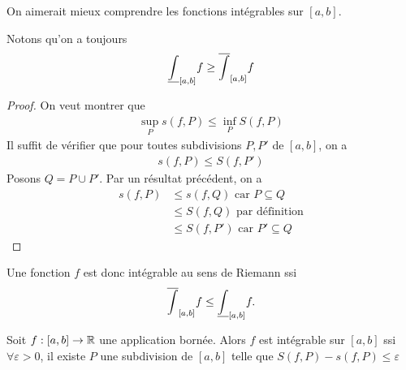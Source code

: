 On aimerait mieux comprendre les fonctions intégrables sur $[a,b]$.
\begin{proposition}
  Notons qu'on a toujours 
\begin{align*}
    \underline{\int}_{[a,b]}f  \ge \overline{\int}_{[a,b]}f
\end{align*}  
\end{proposition}
\begin{proof}
    On veut montrer que 
    \begin{align*}
        \sup_Ps(f,P) \le \inf_P S(f,P)
    \end{align*}
    Il suffit de vérifier que pour toutes subdivisions $P,P'$ de $[a,b]$, on a 
    \begin{align*}
        s(f,P) \le S(f,P')
    \end{align*}
Posons $Q = P\cup P'$. Par un résultat précédent, on a \begin{align*}
    s(f,P)&\le s(f,Q) \text{ car $P\subseteq Q$}\\
    &\le S(f,Q)\text{ par définition}\\
    &\le S(f,P')\text{ car $P'\subseteq Q$}
\end{align*}
\end{proof}
\begin{corollaire}
    Une fonction $f$ est donc intégrable au sens de Riemann ssi 
\begin{align*}
    \overline{\int}_{[a,b]}f \le \underline{\int}_{[a,b]}f.
\end{align*}
\end{corollaire}
\begin{proposition}
    Soit $f:[a,b]\to\mathbb{R}$ une application bornée. Alors $f$ est intégrable sur $[a,b]$ ssi $\forall \varepsilon>0$, il existe $P$ une subdivision de $[a,b]$ telle que $S(f,P)-s(f,P)\le \varepsilon$
\end{proposition}

